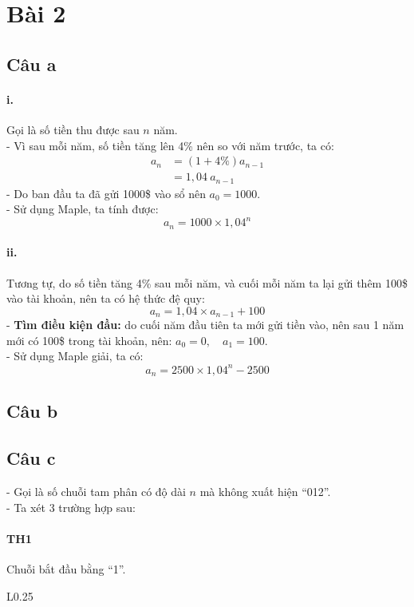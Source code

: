 \documentclass[main.tex]{subfiles}
\begin{document}
\section{Bài 2}
\subsection{Câu a}
\paragraph*{i.}
Gọi  là số tiền thu được sau $n$ năm.\\
- Vì sau mỗi năm, số tiền tăng lên 4\% nên so với năm trước, ta có:
\begin{align*}
a_n &= (1+4\%)a_{n-1}\\
&=1,04\ a_{n-1}
\end{align*}
- Do ban đầu ta đã gửi 1000\$ vào sổ nên $a_0=1000$.\\
- Sử dụng Maple, ta tính được:
$$
a_n = 1000\times 1,04^n
$$

\paragraph*{ii.}
Tương tự, do số tiền tăng 4\% sau mỗi năm, và cuối mỗi năm ta lại gửi thêm 100\$ vào tài khoản, nên ta có hệ thức đệ quy:
$$
a_n = 1,04\times a_{n-1}+100
$$
- \textbf{Tìm điều kiện đầu:} do cuối năm đầu tiên ta mới gửi tiền vào, nên sau 1 năm mới có 100\$ trong tài khoản, nên: $a_0=0, \quad a_1=100$.\\
- Sử dụng Maple giải, ta có:
$$
a_n = 2500 \times 1,04^n - 2500
$$

\subsection{Câu b}

\subsection{Câu c}
- Gọi  là số chuỗi tam phân có độ dài $n$ mà không xuất hiện ``012''.\\
- Ta xét 3 trường hợp sau:

\paragraph{TH1} 
Chuỗi bắt đầu bằng ``1''.\\

\begin{wrapfigure}{L}{0.25\textwidth}
\end{wrapfigure}
\end{document}

